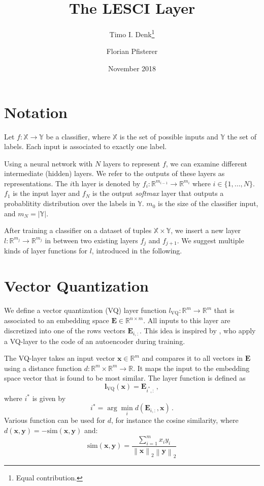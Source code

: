 \documentclass{article}
\title{The LESCI Layer}
\author{
  Timo I. Denk\thanks{Equal contribution.}\\
  \texttt{\blackhref{mailto: mail@timodenk.com}{mail@timodenk.com}}
  \and
  Florian Pfisterer\footnotemark[1]\\
  \texttt{\blackhref{mailto: florian.pfisterer1@gmail.com}{florian.pfisterer1@gmail.com}}
}
\date{November 2018}
\begin{document}
\maketitle

\section{Notation}

Let $f:\mathbb{X}\rightarrow\mathbb{Y}$ be a classifier, where $\mathbb{X}$ is the set of possible inputs and $\mathbb{Y}$ the set of labels. Each input is associated to exactly one label. 

Using a neural network with $N$ layers to represent $f$, we can examine different intermediate (hidden) layers.
We refer to the outputs of these layers as representations.
The $i$th layer is denoted by $f_i: \mathbb{R}^{m_{i-1}} \rightarrow \mathbb{R}^{m_{i}}$ where $i \in \{1,\ldots,N\}$.
$f_1$ is the input layer and $f_N$ is the output \textit{softmax} layer that outputs a probablitity distribution over the labels in $\mathbb{Y}$. $m_0$ is the size of the classifier input, and $m_N = \lvert \mathbb{Y} \rvert$.

After training a classifier on a dataset of tuples $\mathbb{X} \times \mathbb{Y}$, we insert a new layer $l: \mathbb{R}^{m_j} \rightarrow \mathbb{R}^{m_j}$ in between two existing layers $f_j$ and $f_{j+1}$.
We suggest multiple kinds of layer functions for $l$, introduced in the following.

\section{Vector Quantization}

We define a vector quantization (VQ) layer function $l_\text{VQ}: \mathbb{R}^m \rightarrow \mathbb{R}^m$ that is associated to an embedding space $\bm{E} \in \mathbb{R}^{n\times m}$.
All inputs to this layer are discretized into one of the rows vectors $\bm{E}_{i,:}$.
This idea is inspired by \cite{vq-vae}, who apply a VQ-layer to the code of an autoencoder during training.

The VQ-layer takes an input vector $\bm{x} \in \mathbb{R}^m$ and compares it to all vectors in $\bm{E}$ using a distance function $d: \mathbb{R}^{m} \times \mathbb{R}^{m} \rightarrow \mathbb{R}$.
It maps the input to the embedding space vector that is found to be most similar. The layer function is defined as
\begin{equation}
    \bm{l}_\text{VQ}\left(\bm{x}\right)=\bm{E}_{i^*,:}\,,
\end{equation}
where $i^*$ is given by
\begin{equation}
    i^*=\arg\min_i d\left(\bm{E}_{i,:},\bm{x}\right)\,.
    \label{vq-argmin}
\end{equation}
Various function can be used for $d$, for instance the cosine similarity, where $d(\bm{x}, \bm{y})=-\text{sim}(\bm{x}, \bm{y})$ and:
\begin{equation}
    \text{sim}(\bm{x}, \bm{y}) = \frac{\sum^m_{i=1} x_i y_i}{\left\lVert \bm{x} \right\lVert_2 \left\lVert \bm{y} \right\lVert_2}
    \label{cos-sim}
\end{equation}
\end{document}

